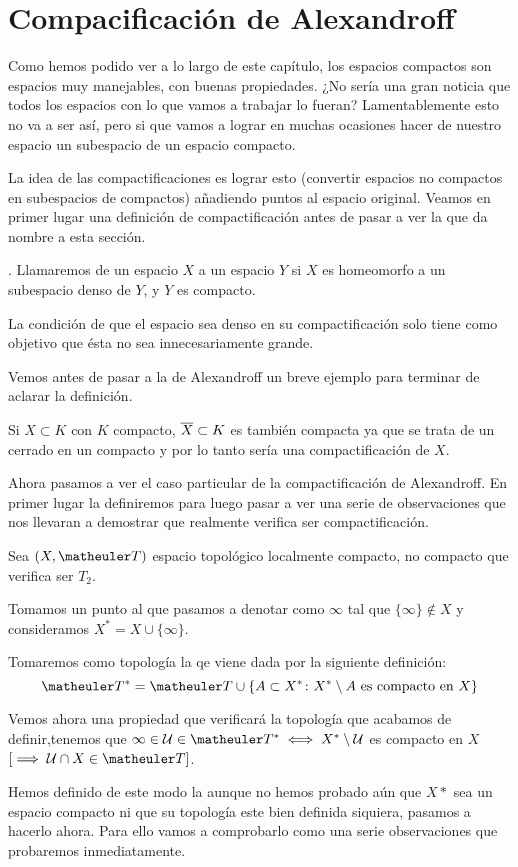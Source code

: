 \section{Compacificación de Alexandroff}

Como hemos podido ver a lo largo de este capítulo, los espacios compactos son espacios muy manejables, con buenas propiedades. ¿No sería una gran noticia que todos los espacios con lo que vamos a trabajar lo fueran? Lamentablemente esto no va a ser así, pero si que vamos a lograr en muchas ocasiones hacer de nuestro espacio un subespacio de un espacio compacto.


La idea de las compactificaciones es lograr esto (convertir espacios no compactos en subespacios de compactos) añadiendo puntos al espacio original.
Veamos en primer lugar una definición de compactificación antes de pasar a ver la que da nombre a esta sección.

\begin{defi}[Compactificación].
Llamaremos  de un espacio $X$ a un espacio $Y$ si $X$ es homeomorfo a un subespacio denso de $Y$, y $Y$ es compacto.
\end{defi}


La condición de que el espacio sea denso en su compactificación solo tiene como objetivo que ésta no sea innecesariamente grande. 


Vemos antes de pasar a la de Alexandroff un breve ejemplo para terminar de aclarar la definición.
\begin{exa}
	Si $X\subset K$ con $K$ compacto, $\overline{X}\subset K$ es también compacta ya que se trata de un cerrado en un compacto y por lo tanto sería una compactificación de $X$.
\end{exa}

Ahora pasamos a ver el caso particular de la compactificación de Alexandroff. En primer lugar la definiremos para luego pasar a ver una serie de observaciones que nos llevaran a demostrar que realmente verifica ser compactificación.
\begin{defi}
	Sea $(X,\T)$ espacio topológico localmente compacto, no compacto que verifica ser $T_2$.
	
	Tomamos un punto al que pasamos a denotar como $\infty$ tal que  $\{\infty\}\notin X$ y consideramos $X^*=X\cup\{\infty\}$. 
	
	Tomaremos como  topología la qe viene dada por la siguiente definición:
	\begin{equation}
		\T ^* = \T \cup \{A \subset X^* \colon X^*\setminus A \textup{ es compacto en }X\}
	\end{equation}
	
	Vemos ahora una propiedad que verificará la topología que acabamos de definir,tenemos que  $\infty\in\U\in\T^* \sii X^*\setminus\U$ es compacto en $X$ $[\ra \U\cap X\in\T]$.
\end{defi}
Hemos definido de este modo la  aunque no hemos probado aún que $X*$ sea un espacio compacto ni que su topología este bien definida siquiera, pasamos a hacerlo ahora. Para ello vamos a comprobarlo como una serie observaciones que probaremos inmediatamente.

